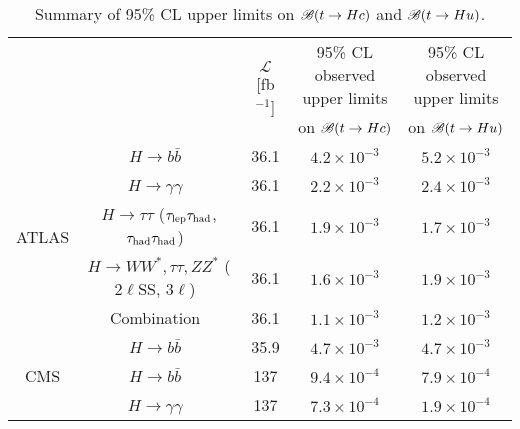 \begin{table}[t!]
\caption{\small{Summary of 95\% CL upper limits on $\mathscr{B}(t \to Hc)$ and $\mathscr{B}(t \to Hu)$.}}
\begin{center}
\tiny
\begin{tabular}{ccccc}
\toprule\toprule
& &\multirow{2}{*}{$\mathcal{L}$ [fb$^{-1}$]} & \multicolumn{1}{c}{95\% CL observed upper limits} & \multicolumn{1}{c}{95\% CL observed upper limits}  \\
& & 										    & \multicolumn{1}{c}{on $\mathscr{B}(t \to Hc)$}            & \multicolumn{1}{c}{on $\mathscr{B}(t \to Hu)$} \\
\midrule
\multirow{5}{*}{ATLAS}
& $H \to b\bar{b}$~\cite{fcnc36}                                          & 36.1         & $4.2 \times 10^{-3}$ & $5.2 \times 10^{-3}$ \\
& $H \to \gamma\gamma$~\cite{Aaboud:2017mfd}                              & 36.1         & $2.2 \times 10^{-3}$  & $2.4 \times 10^{-3}$  \\
& $H \to \tau\tau$ ($\tau_{\mathrm{lep}} \tau_{\mathrm{had}}$, $\tau_{\mathrm{had}} \tau_{\mathrm{had}}$)~\cite{fcnc36}                   & 36.1         & $1.9 \times 10^{-3}$  & $1.7 \times 10^{-3}$  \\ 
& $H \to WW^*, \tau\tau, ZZ^*$ ($2\ell$SS, $3\ell$)~\cite{Aaboud:2018pob} & 36.1         & $1.6 \times 10^{-3}$  & $1.9 \times 10^{-3}$\\ 
& Combination~\cite{fcnc36}                                               & 36.1         & $1.1 \times 10^{-3}$  & $1.2 \times 10^{-3}$  \\\midrule
\multirow{3}{*}{CMS} 
& $H \to b\bar{b}$~\cite{Sirunyan:2017uae}                                & 35.9         & $4.7 \times 10^{-3}$  & $4.7 \times 10^{-3}$  \\
& $H \to b\bar{b}$~\cite{CMS:2021gfa}                                     & 137          & $9.4 \times 10^{-4}$  & $7.9 \times 10^{-4}$  \\
& $H \to \gamma\gamma$~\cite{CMS-PAS-TOP-20-007}                          & 137          & $7.3 \times 10^{-4}$  & $1.9 \times 10^{-4}$  \\
% 

\midrule
\bottomrule\bottomrule
\end{tabular}
\label{tab:limits_summary_ref}
\end{center}
\end{table}




